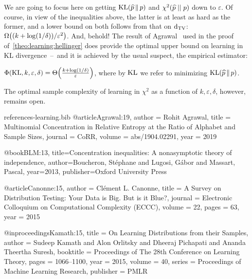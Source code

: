 \documentclass[10pt]{article}
\newcommand{\dst}{\varepsilon}
\newcommand{\ab}{k}
\begin{document}
We are going to focus here on getting $\kldiv{\widehat{p}}{p}$ and $\chisquare{\widehat{p}}{p}$ down to $\dst$. Of course, in view of the inequalities above, the latter is at least as hard as the former, and a lower bound on both follows from that on $\operatorname{d}_{\rm TV}$: $\bigOmega{(\ab+\log(1/\delta))/\dst^2}$. And, behold! The result of Agrawal~\cite{Agrawal:19} used in the proof of~\autoref{theo:learning:hellinger} does provide the optimal upper bound on learning in KL divergence~--~and it is achieved by the usual suspect, the empirical estimator:
\begin{theorem}\label{theo:learning:kl}
  $\Phi(\kl,\ab,\dst,\delta) = \bigTheta{\frac{\ab+\log(1/\delta)}{\dst}}$, where by $\operatorname{KL}$ we refer to minimizing $\kldiv{\widehat{p}}{p}$.
\end{theorem}
\noindent The optimal sample complexity of learning in $\chi^2$ as a function of $\ab,\dst,\delta$, however, remains open.
\begin{filecontents}{references-learning.bib}
@article{Agrawal:19,
  author    = {Rohit Agrawal},
  title     = {Multinomial Concentration in Relative Entropy at the Ratio of Alphabet and Sample Sizes},
  journal   = {CoRR},
  volume    = {abs/1904.02291},
  year      = {2019}
}

@book{BLM:13,
  title={Concentration inequalities: A nonasymptotic theory of independence},
  author={Boucheron, St{\'e}phane and Lugosi, G{\'a}bor and Massart, Pascal},
  year={2013},
  publisher={Oxford University Press}
}


@article{Canonne:15,
  author    = {Cl{\'{e}}ment L. Canonne},
  title     = {{A Survey on Distribution Testing: Your Data is Big. But is it Blue?}},
  journal   = {Electronic Colloquium on Computational Complexity {(ECCC)}},
  volume    = {22},
  pages     = {63},
  year      = {2015}
}



@inproceedings{Kamath:15,
  title = 	 {On Learning Distributions from their Samples},
  author = 	 {Sudeep Kamath and Alon Orlitsky and Dheeraj Pichapati and Ananda Theertha Suresh},
  booktitle = 	 {Proceedings of The 28th Conference on Learning Theory},
  pages = 	 {1066--1100},
  year = 	 {2015},
  volume = 	 {40},
  series = 	 {Proceedings of Machine Learning Research},
  publisher = 	 {PMLR}
}

\end{filecontents}


\end{document}
